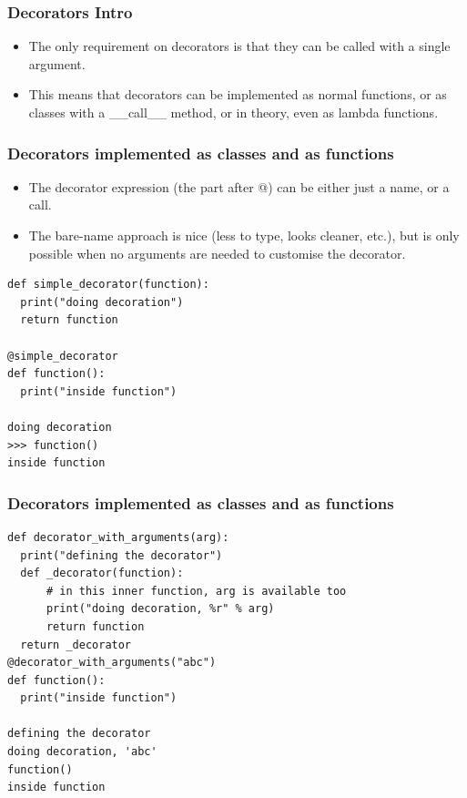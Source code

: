 \begin{frame}[fragile]\frametitle{Decorators Intro}
    \begin{itemize}
    \item The only requirement on decorators is that they can be called with a single argument. 
    \item This means that decorators can be implemented as normal functions, or as classes with a \_\_call\_\_ method, or in theory, even as lambda functions.
    \end{itemize}
\end{frame}

\begin{frame}[fragile]\frametitle{Decorators implemented as classes and as functions}
    \begin{itemize}
    \item The decorator expression (the part after @) can be either just a name, or a call. 
    \item The bare-name approach is nice (less to type, looks cleaner, etc.), but is only possible when no arguments are needed to customise the decorator. 
    \end{itemize}
            \begin{lstlisting}
def simple_decorator(function):
  print("doing decoration")
  return function
  
@simple_decorator
def function():
  print("inside function")

doing decoration
>>> function()
inside function
\end{lstlisting}
\end{frame}

\begin{frame}[fragile]\frametitle{Decorators implemented as classes and as functions}
            \begin{lstlisting}
def decorator_with_arguments(arg):
  print("defining the decorator")
  def _decorator(function):
      # in this inner function, arg is available too
      print("doing decoration, %r" % arg)
      return function
  return _decorator
@decorator_with_arguments("abc")
def function():
  print("inside function")

defining the decorator
doing decoration, 'abc'
function()
inside function
\end{lstlisting}
\end{frame}

